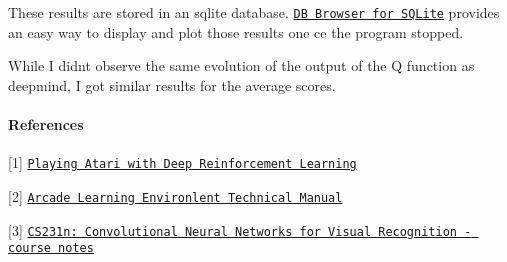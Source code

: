 These results are stored in an sqlite database. \href{https://github.com/sqlitebrowser/sqlitebrowser}{\tt DB Browser for S\+Q\+Lite} provides an easy way to display and plot those results one ce the program stopped.

While I didn\textquotesingle{}t observe the same evolution of the output of the Q function as deepmind, I got similar results for the average scores. 



\paragraph*{References}



 \mbox{[}1\mbox{]} \href{https://arxiv.org/abs/1312.5602}{\tt Playing Atari with Deep Reinforcement Learning}

\mbox{[}2\mbox{]} \href{https://github.com/mgbellemare/Arcade-Learning-Environment/blob/master/doc/manual/manual.pdf}{\tt Arcade Learning Environlent Technical Manual}

\mbox{[}3\mbox{]} \href{http://cs231n.github.io/}{\tt C\+S231n\+: Convolutional Neural Networks for Visual Recognition -\/ course notes} 